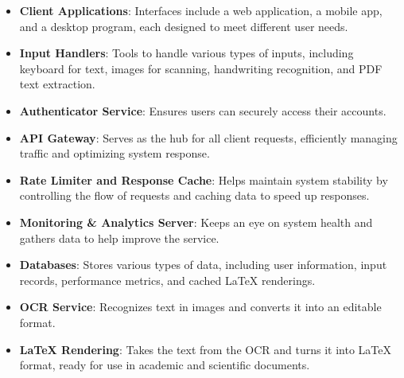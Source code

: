 \documentclass{article}
\begin{document}
\begin{itemize}
    \item \textbf{Client Applications}: Interfaces include a web application, a mobile app, and a desktop program, each designed to meet different user needs.
    \item \textbf{Input Handlers}: Tools to handle various types of inputs, including keyboard for text, images for scanning, handwriting recognition, and PDF text extraction.
    \item \textbf{Authenticator Service}: Ensures users can securely access their accounts.
    \item \textbf{API Gateway}: Serves as the hub for all client requests, efficiently managing traffic and optimizing system response.
    \item \textbf{Rate Limiter and Response Cache}: Helps maintain system stability by controlling the flow of requests and caching data to speed up responses.
    \item \textbf{Monitoring \& Analytics Server}: Keeps an eye on system health and gathers data to help improve the service.
    \item \textbf{Databases}: Stores various types of data, including user information, input records, performance metrics, and cached LaTeX renderings.
    \item \textbf{OCR Service}: Recognizes text in images and converts it into an editable format.
    \item \textbf{LaTeX Rendering}: Takes the text from the OCR and turns it into LaTeX format, ready for use in academic and scientific documents.
\end{itemize}
\end{document}
